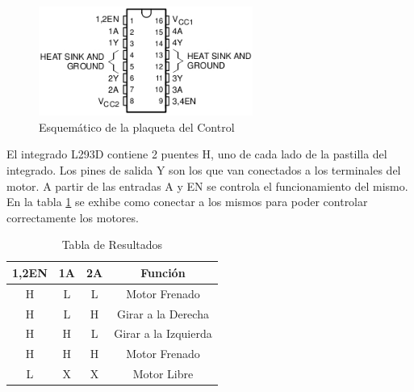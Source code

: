 \documentclass[a4paper,10pt]{article}
\begin{document}
					\begin{figure}[!htb]
						\centering
						\includegraphics[width=7cm]{Imagenes/puenteH.jpg}
						\caption{Esquemático de la plaqueta del Control} \label{timg003}
					\end{figure}

					El integrado L293D contiene 2 puentes H, uno de cada lado de la pastilla del integrado. Los pines de salida Y son los que van conectados a 
					los terminales del motor. A partir de las entradas A y EN se controla el funcionamiento del mismo. En la tabla \ref{tab001} se exhibe como 
					conectar a los mismos para poder controlar correctamente los motores.
				
					\begin{table}[!htp]
						\centering
						\begin{tabular}{|c|c|c|c|}
							\hline
							1,2EN & 1A & 2A & Función \\
							\hline
							H & L & L & Motor Frenado \\
							\hline 
							H & L	& H & Girar a la Derecha \\
							\hline
							H & H & L & Girar a la Izquierda \\
							\hline
							H & H & H &  Motor Frenado \\
							\hline
							L & X & X & Motor Libre \\	
							\hline
						\end{tabular}
					\caption{Tabla de Resultados} \label{tab001}
					\end{table}
\end{document}
